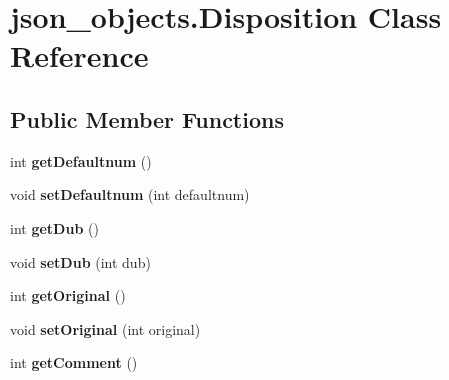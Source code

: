 \hypertarget{classjson__objects_1_1_disposition}{
\section{json\_\-objects.Disposition Class Reference}
\label{classjson__objects_1_1_disposition}
}
\subsection*{Public Member Functions}
\begin{DoxyCompactItemize}
\item 
\hypertarget{classjson__objects_1_1_disposition_a6244c08de125d9da639543cfb03315dc}{
int {\bfseries getDefaultnum} ()}
\label{classjson__objects_1_1_disposition_a6244c08de125d9da639543cfb03315dc}

\item 
\hypertarget{classjson__objects_1_1_disposition_a287b1ec7feb08ff48201d585d3dfae9a}{
void {\bfseries setDefaultnum} (int defaultnum)}
\label{classjson__objects_1_1_disposition_a287b1ec7feb08ff48201d585d3dfae9a}

\item 
\hypertarget{classjson__objects_1_1_disposition_a807a7d2866f2684fe330fdd1eb3fee67}{
int {\bfseries getDub} ()}
\label{classjson__objects_1_1_disposition_a807a7d2866f2684fe330fdd1eb3fee67}

\item 
\hypertarget{classjson__objects_1_1_disposition_aedc3dca7a6fc217de4b2cf47e2f0f7fa}{
void {\bfseries setDub} (int dub)}
\label{classjson__objects_1_1_disposition_aedc3dca7a6fc217de4b2cf47e2f0f7fa}

\item 
\hypertarget{classjson__objects_1_1_disposition_a3e8ed8ecc61bbcf77d2b9a45003fdafd}{
int {\bfseries getOriginal} ()}
\label{classjson__objects_1_1_disposition_a3e8ed8ecc61bbcf77d2b9a45003fdafd}

\item 
\hypertarget{classjson__objects_1_1_disposition_a34f858d94b66c1d45f3ab2bb6645b687}{
void {\bfseries setOriginal} (int original)}
\label{classjson__objects_1_1_disposition_a34f858d94b66c1d45f3ab2bb6645b687}

\item 
\hypertarget{classjson__objects_1_1_disposition_a1ed469833e8dbfddcf42454da6fd8a55}{
int {\bfseries getComment} ()}
\label{classjson__objects_1_1_disposition_a1ed469833e8dbfddcf42454da6fd8a55}


\end{DoxyCompactItemize}
